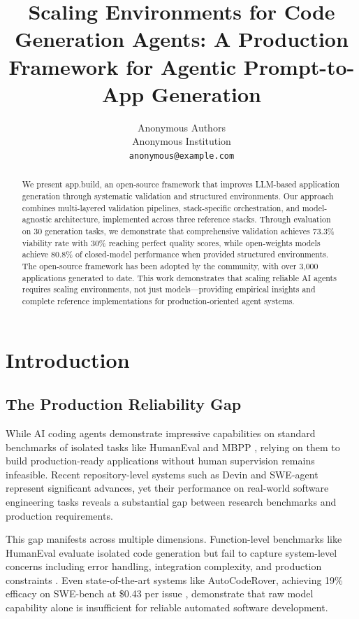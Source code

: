 \documentclass{article}
\title{Scaling Environments for Code Generation Agents: A Production Framework for Agentic Prompt-to-App Generation}
\author{%
  Anonymous Authors \\
  Anonymous Institution \\
  \texttt{anonymous@example.com} \\
}
\begin{document}
\maketitle

\begin{abstract}
We present app.build, an open-source framework that improves LLM-based application generation through systematic validation and structured environments. Our approach combines multi-layered validation pipelines, stack-specific orchestration, and model-agnostic architecture, implemented across three reference stacks. Through evaluation on 30 generation tasks, we demonstrate that comprehensive validation achieves 73.3\% viability rate with 30\% reaching perfect quality scores, while open-weights models achieve 80.8\% of closed-model performance when provided structured environments. The open-source framework has been adopted by the community, with over 3,000 applications generated to date. This work demonstrates that scaling reliable AI agents requires scaling environments, not just models---providing empirical insights and complete reference implementations for production-oriented agent systems.
\end{abstract}

\section{Introduction}
\label{sec:intro}

\subsection{The Production Reliability Gap}

While AI coding agents demonstrate impressive capabilities on standard benchmarks of isolated tasks like HumanEval \citep{chen2021evaluating} and MBPP \citep{austin2021program}, relying on them to build production-ready applications without human supervision remains infeasible. Recent repository-level systems such as Devin \citep{cognition2024swe} and SWE-agent \citep{yang2024swe} represent significant advances, yet their performance on real-world software engineering tasks reveals a substantial gap between research benchmarks and production requirements.

This gap manifests across multiple dimensions. Function-level benchmarks like HumanEval evaluate isolated code generation but fail to capture system-level concerns including error handling, integration complexity, and production constraints \citep{liu2023your}. Even state-of-the-art systems like AutoCodeRover, achieving 19\% efficacy on SWE-bench at \$0.43 per issue \citep{zhang2024autocoder}, demonstrate that raw model capability alone is insufficient for reliable automated software development.
\end{document}
